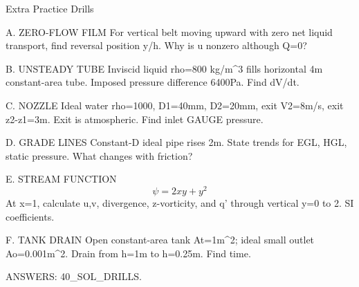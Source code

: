 Extra Practice Drills

A. ZERO-FLOW FILM
For vertical belt moving upward with zero net liquid transport, find reversal position y/h. Why is u nonzero although Q=0?

B. UNSTEADY TUBE
Inviscid liquid rho=800 kg/m^3 fills horizontal 4m constant-area tube. Imposed pressure difference 6400Pa. Find dV/dt.

C. NOZZLE
Ideal water rho=1000, D1=40mm, D2=20mm, exit V2=8m/s, exit z2-z1=3m. Exit is atmospheric. Find inlet GAUGE pressure.

D. GRADE LINES
Constant-D ideal pipe rises 2m. State trends for EGL, HGL, static pressure. What changes with friction?

E. STREAM FUNCTION
$$\psi=2xy+y^2$$
At x=1, calculate u,v, divergence, z-vorticity, and q' through vertical y=0 to 2. SI coefficients.

F. TANK DRAIN
Open constant-area tank At=1m^2; ideal small outlet Ao=0.001m^2. Drain from h=1m to h=0.25m. Find time.

ANSWERS: 40_SOL_DRILLS.
